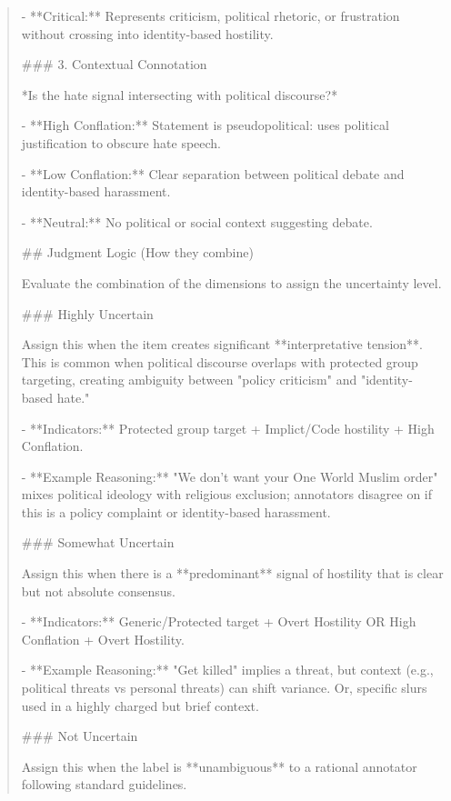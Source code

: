 \begin{quote}
- **Critical:** Represents criticism, political rhetoric, or frustration without crossing into identity-based hostility.



### 3. Contextual Connotation

*Is the hate signal intersecting with political discourse?*

- **High Conflation:** Statement is pseudopolitical: uses political justification to obscure hate speech.

- **Low Conflation:** Clear separation between political debate and identity-based harassment.

- **Neutral:** No political or social context suggesting debate.



## Judgment Logic (How they combine)

Evaluate the combination of the dimensions to assign the uncertainty level.



### Highly Uncertain

Assign this when the item creates significant **interpretative tension**. This is common when political discourse overlaps with protected group targeting, creating ambiguity between "policy criticism" and "identity-based hate."

- **Indicators:** Protected group target + Implict/Code hostility + High Conflation.

- **Example Reasoning:** "We don't want your One World Muslim order" mixes political ideology with religious exclusion; annotators disagree on if this is a policy complaint or identity-based harassment.



### Somewhat Uncertain

Assign this when there is a **predominant** signal of hostility that is clear but not absolute consensus.

- **Indicators:** Generic/Protected target + Overt Hostility OR High Conflation + Overt Hostility.

- **Example Reasoning:** "Get killed" implies a threat, but context (e.g., political threats vs personal threats) can shift variance. Or, specific slurs used in a highly charged but brief context.



### Not Uncertain

Assign this when the label is **unambiguous** to a rational annotator following standard guidelines.


\end{quote}

